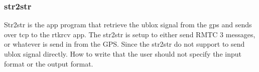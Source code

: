 \subsubsection{str2str}
Str2str is the app program that retrieve the ublox signal from the gps and sends over tcp to the rtkrcv app. The str2str is setup to either send RMTC 3 messages, or whatever is send in from the GPS. Since the str2str do not support to send ublox signal directly. How to write that the user should not specify the input format or the output format.



\cleardoublepage